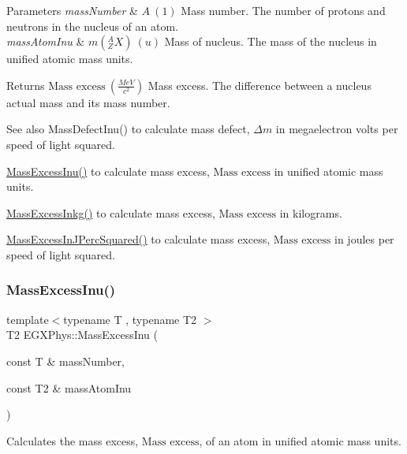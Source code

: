 \begin{DoxyParams}{Parameters}
{\em mass\+Number} & $A\ (1)$ Mass number. The number of protons and neutrons in the nucleus of an atom. \\
\hline
{\em mass\+Atom\+Inu} & $m({^A_ZX})\ (u)$ Mass of nucleus. The mass of the nucleus in unified atomic mass units. \\
\hline
\end{DoxyParams}
\begin{DoxyReturn}{Returns}
$\text{Mass excess}\ (\frac{MeV}{c^2})$ Mass excess. The difference between a nucleus actual mass and its mass number. 
\end{DoxyReturn}
\begin{DoxySeeAlso}{See also}
Mass\+Defect\+Inu() to calculate mass defect, $\Delta m$ in megaelectron volts per speed of light squared. 

\hyperlink{group___mass_excess_ga61c6f557bd742126c0c76e88cf7740ad}{Mass\+Excess\+Inu()} to calculate mass excess, $\text{Mass excess}$ in unified atomic mass units. 

\hyperlink{group___mass_excess_gab72a3640886092be8b9c9662020a2306}{Mass\+Excess\+Inkg()} to calculate mass excess, $\text{Mass excess}$ in kilograms. 

\hyperlink{group___mass_excess_ga3eb487f438543e950b9c5aece4c5b409}{Mass\+Excess\+In\+J\+Perc\+Squared()} to calculate mass excess, $\text{Mass excess}$ in joules per speed of light squared. 
\end{DoxySeeAlso}
\mbox{\label{group___mass_excess_ga61c6f557bd742126c0c76e88cf7740ad}} 
\subsubsection{\texorpdfstring{Mass\+Excess\+Inu()}{MassExcessInu()}}
{\footnotesize\ttfamily template$<$typename T , typename T2 $>$ \\
T2 E\+G\+X\+Phys\+::\+Mass\+Excess\+Inu (\begin{DoxyParamCaption}\item[{const T \&}]{mass\+Number,  }\item[{const T2 \&}]{mass\+Atom\+Inu }\end{DoxyParamCaption})}



Calculates the mass excess, $\text{Mass excess}$, of an atom in unified atomic mass units. 

